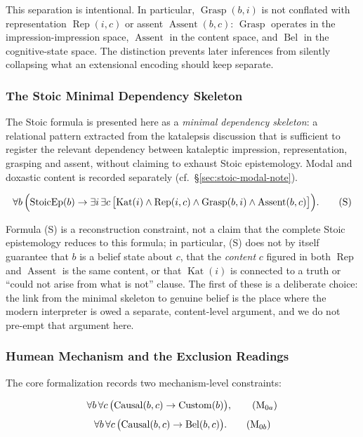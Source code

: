 This separation is intentional. In particular,
$\operatorname{Grasp}(b,i)$ is not conflated with representation
$\operatorname{Rep}(i,c)$ or assent $\operatorname{Assent}(b,c)$:
$\operatorname{Grasp}$ operates in the impression-impression space,
$\operatorname{Assent}$ in the content space, and $\operatorname{Bel}$
in the cognitive-state space. The distinction prevents later
inferences from silently collapsing what an extensional encoding
should keep separate.

\subsubsection{The Stoic Minimal Dependency Skeleton}
\label{sec:stoic-skeleton}

The Stoic formula is presented here as a \emph{minimal dependency
skeleton}: a relational pattern extracted from the katalepsis
discussion that is sufficient to register the relevant dependency
between kataleptic impression, representation, grasping and assent,
without claiming to exhaust Stoic epistemology. Modal and doxastic
content is recorded separately (cf.\ \S\ref{sec:stoic-modal-note}).

\[
\forall b\,
\Bigl(
\operatorname{StoicEp}(b)
\rightarrow
\exists i\,\exists c\,
\bigl[
\operatorname{Kat}(i)\land
\operatorname{Rep}(i,c)\land
\operatorname{Grasp}(b,i)\land
\operatorname{Assent}(b,c)
\bigr]
\Bigr).
\tag{S}
\]

Formula (S) is a reconstruction constraint, not a claim that the
complete Stoic epistemology reduces to this formula; in particular,
(S) does not by itself guarantee that $b$ is a belief state about
$c$, that the \emph{content} $c$ figured in both $\operatorname{Rep}$
and $\operatorname{Assent}$ is the same content, or that
$\operatorname{Kat}(i)$ is connected to a truth or ``could not arise
from what is not'' clause. The first of these is a deliberate choice:
the link from the minimal skeleton to genuine belief is the place
where the modern interpreter is owed a separate, content-level
argument, and we do not pre-empt that argument here.

\subsubsection{Humean Mechanism and the Exclusion Readings}
\label{sec:hume-readings}

The core formalization records two mechanism-level constraints:

\[
\forall b\,\forall c\,
\bigl(\operatorname{Causal}(b,c)\rightarrow \operatorname{Custom}(b)\bigr),
\tag{M$_{0a}$}
\]
\[
\forall b\,\forall c\,
\bigl(\operatorname{Causal}(b,c)\rightarrow \operatorname{Bel}(b,c)\bigr).
\tag{M$_{0b}$}
\]

